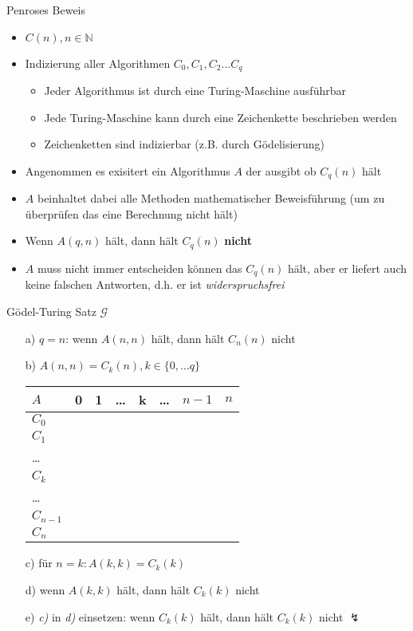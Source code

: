 \begin{frame}{Penroses Beweis}
    \begin{itemize}
        \item $C(n), n \in \mathbb{N}$
        \item Indizierung aller Algorithmen $C_0, C_1, C_2 \ldots C_q$
        \begin{itemize}
            \item Jeder Algorithmus ist durch eine Turing-Maschine ausführbar
            \item Jede Turing-Maschine kann durch eine Zeichenkette beschrieben werden
            \item Zeichenketten sind indizierbar (z.B. durch Gödelisierung)
        \end{itemize}
        \item Angenommen es exisitert ein Algorithmus $A$ der ausgibt ob $C_q(n)$ hält
        \item $A$ beinhaltet dabei alle Methoden mathematischer Beweisführung (um zu überprüfen das eine Berechnung nicht hält)
        \item Wenn $A(q,n)$ hält, dann hält $C_q(n)$ \textbf{nicht}
        \item $A$ muss nicht immer entscheiden können das $C_q(n)$ hält, aber er liefert auch keine falschen Antworten, d.h. er ist \emph{widerspruchsfrei}
    \end{itemize}
\end{frame}

\begin{frame}{Gödel-Turing Satz $\mathscr{G}$}
    \begin{itemize}
        \item[a)] $q=n$: wenn $A(n,n)$ hält, dann hält $C_n(n)$ nicht %
        \item[b)] $A(n,n)=C_k(n), k \in \{0, \ldots q\}$\\
\vspace{3mm}
\begin{tabular}{l|p{8mm}p{8mm}p{8mm}p{8mm}p{8mm}p{8mm}p{8mm}}
$A$     & 0 & 1 & \ldots & k & \dots & $n-1$ & $n$\\
\hline
$C_0$   & \cellcolor{colorb} & & & & & & \\
$C_1$   & & \cellcolor{colorb} & & & & & \\
\ldots  & & & \cellcolor{colorb} & & & & \\
\rowcolor{colorb}
$C_k$   & & & & \cellcolor{colore} & & & \\
\ldots  & & & & & \cellcolor{colorb} & & \\
$C_{n-1}$ & & & & & & \cellcolor{colorb} & \\
$C_n$   & & & & & & & \cellcolor{colorb}
\end{tabular}
\vspace{3mm}
        \item[c)] für $n=k: A(k,k) = C_k(k)$
        \item[d)] wenn $A(k,k)$ hält, dann hält $C_k(k)$ nicht
        \item[e)] \emph{c)} in \emph{d)} einsetzen: wenn $C_k(k)$ hält, dann hält $C_k(k)$ nicht $\lightning$
    \end{itemize}
\end{frame}

